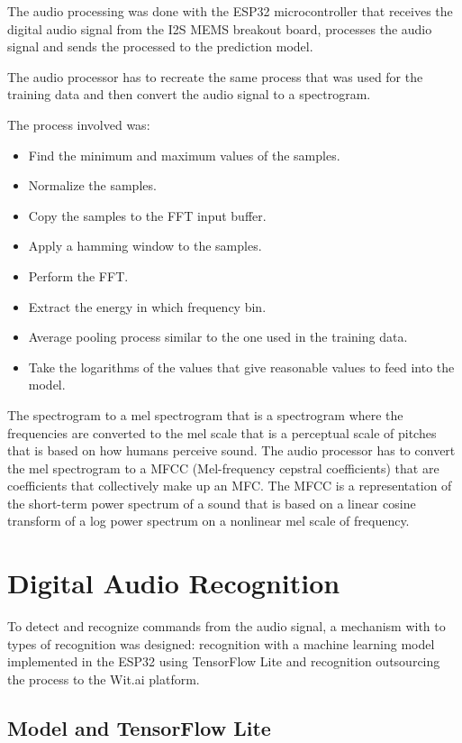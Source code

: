 The audio processing was done with the ESP32 microcontroller that receives the digital audio signal from the I2S MEMS breakout board, processes the audio signal and sends the processed to the prediction model.

The audio processor has to recreate the same process that was used for the training data and then convert the audio signal to a spectrogram.  

The process involved was:
\begin{itemize}
    \item Find the minimum and maximum values of the samples.
    \item Normalize the samples.
    \item Copy the samples to the FFT input buffer.
    \item Apply a hamming window to the samples.
    \item Perform the FFT.
    \item Extract the energy in which frequency bin.
    \item Average pooling process similar to the one used in the training data.
    \item Take the logarithms of the values that give reasonable values to feed into the model.
\end{itemize}

The spectrogram to a mel spectrogram that is a spectrogram where the frequencies are converted to the mel scale that is a perceptual scale of pitches that is based on how humans perceive sound. The audio processor has to convert the mel spectrogram to a MFCC (Mel-frequency cepstral coefficients) that are coefficients that collectively make up an MFC. The MFCC is a representation of the short-term power spectrum of a sound that is based on a linear cosine transform of a log power spectrum on a nonlinear mel scale of frequency.


\section{Digital Audio Recognition}

To detect and recognize commands from the audio signal, a mechanism with to types of recognition was designed: recognition with a machine learning model implemented in the ESP32 using TensorFlow Lite and recognition outsourcing the process to the Wit.ai platform.

\subsection{Model and TensorFlow Lite} 

